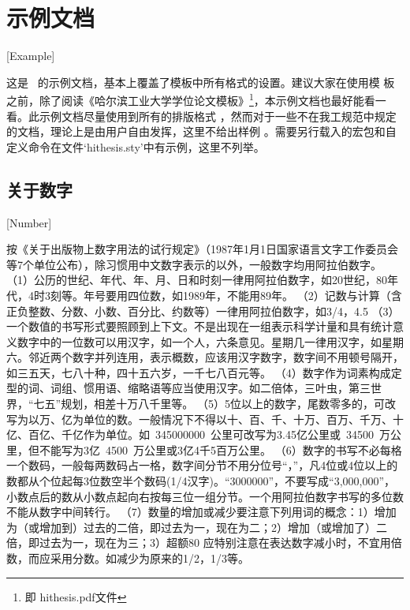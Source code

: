 
\chapter{示例文档}[Example]

这是 \hithesis\ 的示例文档，基本上覆盖了模板中所有格式的设置。建议大家在使用模
板之前，除了阅读《\hithesis\:哈尔滨工业大学学位论文模板》\footnote{即
	hithesis.pdf文件}，本示例文档也最好能看一看。此示例文档尽量使用到所有的排版格式
，然而对于一些不在我工规范中规定的文档，理论上是由用户自由发挥，这里不给出样例
。需要另行载入的宏包和自定义命令在文件`hithesis.sty'中有示例，这里不列举。

\section{关于数字}[Number]

按《关于出版物上数字用法的试行规定》（1987年1月1日国家语言文字工作委员会等7个单位公布），除习惯用中文数字表示的以外，一般数字均用阿拉伯数字。
（1）公历的世纪、年代、年、月、日和时刻一律用阿拉伯数字，如20世纪，80年代，4时3刻等。年号要用四位数，如1989年，不能用89年。
（2）记数与计算（含正负整数、分数、小数、百分比、约数等）一律用阿拉伯数字，如3/4，4.5%
（3）一个数值的书写形式要照顾到上下文。不是出现在一组表示科学计量和具有统计意义数字中的一位数可以用汉字，如一个人，六条意见。星期几一律用汉字，如星期六。邻近两个数字并列连用，表示概数，应该用汉字数字，数字间不用顿号隔开，如三五天，七八十种，四十五六岁，一千七八百元等。
（4）数字作为词素构成定型的词、词组、惯用语、缩略语等应当使用汉字。如二倍体，三叶虫，第三世界，“七五”规划，相差十万八千里等。
（5）5位以上的数字，尾数零多的，可改写为以万、亿为单位的数。一般情况下不得以十、百、千、十万、百万、千万、十亿、百亿、千亿作为单位。如~\num{345000000}~公里可改写为3.45亿公里或~\num{34500}~万公里，但不能写为3亿~\num{4500}~万公里或3亿4千5百万公里。
（6）数字的书写不必每格一个数码，一般每两数码占一格，数字间分节不用分位号“，”，凡4位或4位以上的数都从个位起每3位数空半个数码(1/4汉字)。“\num{3000000}”，不要写成“3,000,000”，小数点后的数从小数点起向右按每三位一组分节。一个用阿拉伯数字书写的多位数不能从数字中间转行。
（7）数量的增加或减少要注意下列用词的概念：1）增加为（或增加到）过去的二倍，即过去为一，现在为二；2）增加（或增加了）二倍，即过去为一，现在为三；3）超额80%
应特别注意在表达数字减小时，不宜用倍数，而应采用分数。如减少为原来的1/2，1/3等。


